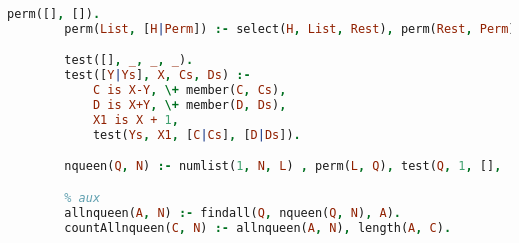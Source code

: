 \documentclass{article}
\begin{document}
\begin{enumerate}
          \begin{lstlisting}[language=Prolog]
        perm([], []).
        perm(List, [H|Perm]) :- select(H, List, Rest), perm(Rest, Perm).

        test([], _, _, _).
        test([Y|Ys], X, Cs, Ds) :-
            C is X-Y, \+ member(C, Cs),
            D is X+Y, \+ member(D, Ds),
            X1 is X + 1,
            test(Ys, X1, [C|Cs], [D|Ds]).

        nqueen(Q, N) :- numlist(1, N, L) , perm(L, Q), test(Q, 1, [], []).

        % aux
        allnqueen(A, N) :- findall(Q, nqueen(Q, N), A).
        countAllnqueen(C, N) :- allnqueen(A, N), length(A, C).
        \end{lstlisting}

\end{enumerate}
\end{document}
